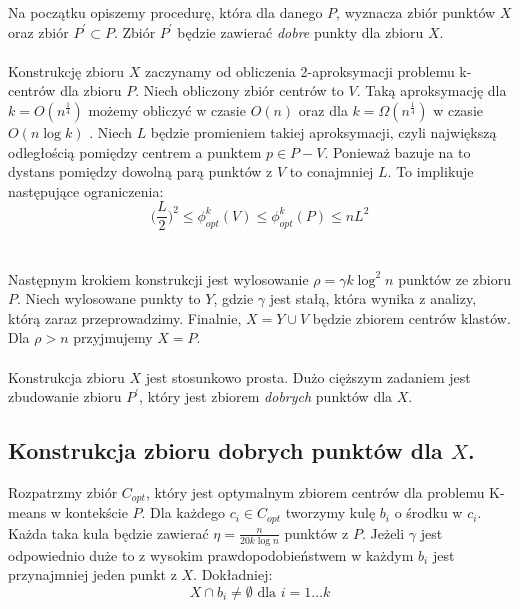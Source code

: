 \noindent
Na początku opiszemy procedurę, która dla danego $P$, wyznacza zbiór punktów $X$ oraz zbiór $P^{'} \subset P$.
Zbiór $P^{'}$ będzie zawierać \textit{dobre} punkty dla zbioru $X$.
\\~\\
Konstrukcję zbioru $X$ zaczynamy od obliczenia 2-aproksymacji problemu k-centrów dla zbioru $P$.
Niech obliczony zbiór centrów to $V$.
Taką aproksymację dla $k = O(n^{\frac{1}{4}})$ możemy obliczyć w czasie $O(n)$ oraz dla $k = \Omega(n^{\frac{1}{4}})$ w czasie $O(n \log k)$ \cite{10.1145/62212.62255}.
Niech $L$ będzie promieniem takiej aproksymacji, czyli największą odległością pomiędzy centrem a punktem $p \in P-V$.
Ponieważ \cite{10.1145/62212.62255} bazuje na \cite{Gonzalez1985ClusteringTM} to dystans pomiędzy dowolną parą punktów z $V$ to conajmniej $L$.
To implikuje następujące ograniczenia:
\begin{equation}
    \Big( \frac{L}{2 } \Big)^2 \leq \phi_{opt}^{k}(V) \leq \phi_{opt}^{k}(P) \leq nL^{2}
\end{equation} 
\\~\\
Następnym krokiem konstrukcji jest wylosowanie $\rho = \gamma k \log^{2} n$ punktów ze zbioru $P$.
Niech wylosowane punkty to $Y$, gdzie $\gamma$ jest stałą, która wynika z analizy, którą zaraz przeprowadzimy.
Finalnie, $X = Y \cup V$ będzie zbiorem centrów klastów.
Dla $\rho > n$ przyjmujemy $X = P$.
\\~\\
Konstrukcja zbioru $X$ jest stosunkowo prosta.
Dużo cięższym zadaniem jest zbudowanie zbioru $P^{'}$, który jest zbiorem \textit{dobrych} punktów dla $X$.

\subsection{Konstrukcja zbioru dobrych punktów dla $X$.}

Rozpatrzmy zbiór $C_{opt}$, który jest optymalnym zbiorem centrów dla problemu K-means w kontekście $P$.
Dla każdego $c_{i} \in C_{opt}$ tworzymy kulę $b_{i}$ o środku w $c_{i}$.
Każda taka kula będzie zawierać $\eta = \frac{n}{20k \log n}$ punktów z $P$.
Jeżeli $\gamma$ jest odpowiednio duże to z wysokim prawdopodobieństwem w każdym $b_{i}$ jest przynajmniej jeden punkt z $X$.
Dokładniej:
\begin{equation}
    X \cap b_{i} \neq \emptyset \text{ dla } i = 1 \dots k
\end{equation}

